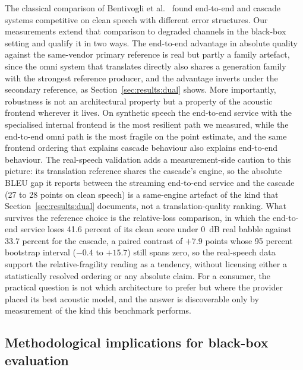 The classical comparison of Bentivogli et al.~\cite{bentivogli2021cascade}
found end-to-end and cascade systems competitive on clean speech with
different error structures. Our measurements extend that comparison to
degraded channels in the black-box setting and qualify it in two ways. The
end-to-end advantage in absolute quality against the same-vendor primary reference is
real but partly a family artefact, since the omni system that translates
directly also shares a generation family with the strongest reference
producer, and the advantage inverts under the secondary reference, as
Section~\ref{sec:results:dual} shows. More importantly, robustness is not an
architectural property but a property of the acoustic frontend wherever it
lives. On synthetic speech the
end-to-end service with the specialised internal frontend is the
most resilient path we measured, while the end-to-end omni path is the most
fragile on the point estimate, and the same frontend ordering that explains cascade behaviour also
explains end-to-end behaviour. The real-speech validation adds a
measurement-side caution to this picture: its translation reference shares
the cascade's engine, so the absolute BLEU gap it reports between the
streaming end-to-end service and the cascade (27 to 28 points on clean
speech) is a same-engine artefact of the kind that
Section~\ref{sec:results:dual} documents, not a translation-quality
ranking. What survives the reference choice is the relative-loss
comparison, in which the end-to-end service loses 41.6 percent of its
clean score under 0~dB real babble against 33.7 percent for the cascade,
a paired contrast of $+7.9$ points whose 95 percent bootstrap interval
($-0.4$ to $+15.7$) still spans zero, so the real-speech data support the
relative-fragility reading as a tendency, without licensing either a
statistically resolved ordering or any absolute claim. For a consumer, the practical
question is not
which architecture to prefer but where the provider placed its best acoustic
model, and the answer is discoverable only by measurement of the kind this
benchmark performs.

\subsection{Methodological implications for black-box evaluation}

